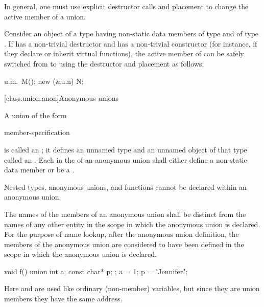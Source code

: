 \pnum
\begin{note} In general, one must use explicit destructor calls and placement
 to change the active member of a union. \end{note}
\begin{example}
Consider an object  of a  type  having non-static data members
 of type  and  of type . If  has a non-trivial
destructor and  has a non-trivial constructor (for instance, if they declare or inherit
virtual functions), the active member of  can be safely switched from  to
 using the destructor and placement  as follows:

\begin{codeblock}
u.m.~M();
new (&u.n) N;
\end{codeblock}
\end{example}

[class.union.anon]{Anonymous unions}
%

\pnum
A union of the form

\begin{ncsimplebnf}
 \terminal{\{} member-specification \terminal{\}} \terminal{;}
\end{ncsimplebnf}

is called an ; it defines an unnamed type and
an unnamed object of that type called an .
Each  in the 
of an anonymous union shall either define a non-static data member or be a
.
\begin{note}
Nested types, anonymous unions, and functions cannot be declared within an anonymous
union.
\end{note}
The names of the members of an anonymous union shall be distinct from
the names of any other entity in the scope in which the anonymous union
is declared. For the purpose of name lookup, after the anonymous union
definition, the members of the anonymous union are considered to have
been defined in the scope in which the anonymous union is declared.
%
\begin{example}

\begin{codeblock}
void f() {
  union { int a; const char* p; };
  a = 1;
  p = "Jennifer";
}
\end{codeblock}

Here  and  are used like ordinary (non-member)
variables, but since they are union members they have the same address.
\end{example}

